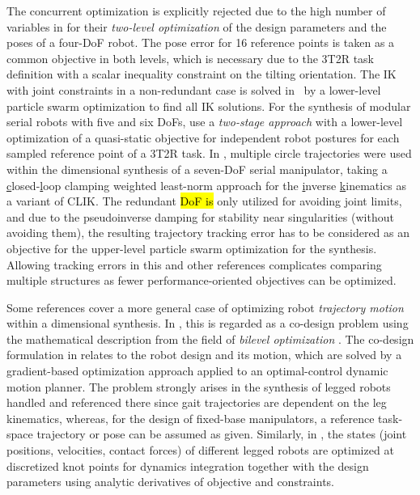 The {concurrent} optimization is explicitly rejected {due to the high number of variables} in \cite{RussoRaiDonAxi2021} for their \emph{two-level optimization} of the design parameters and the poses of a four-DoF robot.
The pose error for 16 reference points is taken as a {common} objective in both levels, which is necessary due to the 3T2R task definition with a scalar inequality constraint on the tilting orientation.
The IK with joint constraints in a non-redundant case is solved in~\cite{PatelSob2015a} by a lower-level particle swarm optimization to find all IK solutions.
For {the synthesis of} modular serial robots with five and six DoFs, \cite{RomitiIacRuzKas2023} use %
%
a \emph{two-stage approach} with a lower-level optimization of a quasi-static objective for independent robot postures for each sampled reference point of a 3T2R task.
In \cite{WanDinYaoWu2018}, multiple circle trajectories were used within the dimensional synthesis of a seven-DoF serial manipulator, {taking} a {\underline{c}}losed-{\underline{l}}oop clamping weighted least-norm approach for the {\underline{i}}nverse {\underline{k}}inematics as a variant of CLIK. %
The redundant \hl{DoF is} %
only {utilized} for avoiding joint limits, and due to the pseudoinverse damping for stability near singularities (without avoiding them), the resulting trajectory tracking error has to be considered as an objective for the upper-level particle swarm optimization for the synthesis.
Allowing tracking errors in this and other references complicates comparing multiple structures as {fewer} performance-oriented objectives can be optimized.

Some references cover a more general case of optimizing robot \emph{trajectory motion} within a dimensional synthesis.
In \cite{Dinev2023}, this is regarded as a co-design problem using the mathematical description from the field of \emph{bilevel optimization} \cite{SinhaMalDeb2017}.
The co-design formulation in \cite{Dinev2023} relates to the robot design and its motion, which are solved by a gradient-based optimization approach applied to an optimal-control dynamic motion planner.
The problem strongly arises in the synthesis of legged robots handled and referenced there since gait trajectories are dependent on the leg kinematics, whereas, for the design of fixed-base manipulators, a reference task-space trajectory or pose can be assumed as given.
Similarly, in \cite{SpielbergAraSunTed2017}, the states (joint positions, velocities, contact forces) of different legged robots are optimized at discretized knot points for dynamics integration together with the design parameters using analytic derivatives of objective and constraints.

